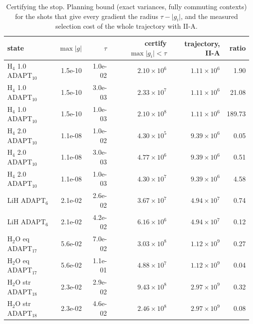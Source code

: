 \documentclass[aps,pra,reprint,superscriptaddress,nofootinbib]{revtex4-2}
\begin{document}
\begin{table}[!htb]
\centering\small
\caption{Certifying the stop. Planning bound (exact variances, fully commuting contexts) for the shots that give every gradient the radius $\tau-\lvert g_i\rvert$, and the measured selection cost of the whole trajectory with II-A.}
\label{tab:termination}
\begin{tabular}{lrrrrr}
\toprule
state & $\max\lvert g\rvert$ & $\tau$ & certify $\max\lvert g_i\rvert<\tau$ & trajectory, II-A & ratio \\
\midrule
H$_4$ 1.0 ADAPT$_{10}$ & 1.5e-10 & 1.0e-02 & $2.10\times10^{6}$ & $1.11\times10^{6}$ & 1.90 \\
H$_4$ 1.0 ADAPT$_{10}$ & 1.5e-10 & 3.0e-03 & $2.33\times10^{7}$ & $1.11\times10^{6}$ & 21.08 \\
H$_4$ 1.0 ADAPT$_{10}$ & 1.5e-10 & 1.0e-03 & $2.10\times10^{8}$ & $1.11\times10^{6}$ & 189.73 \\
H$_4$ 2.0 ADAPT$_{10}$ & 1.1e-08 & 1.0e-02 & $4.30\times10^{5}$ & $9.39\times10^{6}$ & 0.05 \\
H$_4$ 2.0 ADAPT$_{10}$ & 1.1e-08 & 3.0e-03 & $4.77\times10^{6}$ & $9.39\times10^{6}$ & 0.51 \\
H$_4$ 2.0 ADAPT$_{10}$ & 1.1e-08 & 1.0e-03 & $4.30\times10^{7}$ & $9.39\times10^{6}$ & 4.58 \\
LiH ADAPT$_6$ & 2.1e-02 & 2.6e-02 & $3.67\times10^{7}$ & $4.94\times10^{7}$ & 0.74 \\
LiH ADAPT$_6$ & 2.1e-02 & 4.2e-02 & $6.16\times10^{6}$ & $4.94\times10^{7}$ & 0.12 \\
H$_2$O eq ADAPT$_{17}$ & 5.6e-02 & 7.0e-02 & $3.03\times10^{8}$ & $1.12\times10^{9}$ & 0.27 \\
H$_2$O eq ADAPT$_{17}$ & 5.6e-02 & 1.1e-01 & $4.88\times10^{7}$ & $1.12\times10^{9}$ & 0.04 \\
H$_2$O str ADAPT$_{18}$ & 2.3e-02 & 2.9e-02 & $9.43\times10^{8}$ & $2.97\times10^{9}$ & 0.32 \\
H$_2$O str ADAPT$_{18}$ & 2.3e-02 & 4.6e-02 & $2.46\times10^{8}$ & $2.97\times10^{9}$ & 0.08 \\
\bottomrule
\end{tabular}
\end{table}
\end{document}
